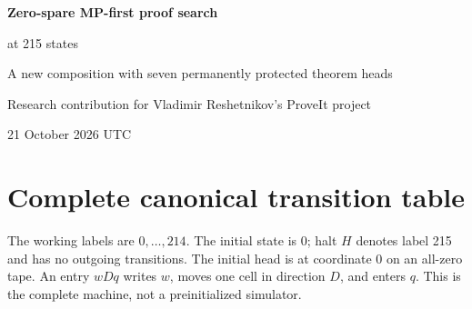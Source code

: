 \documentclass[11pt]{article}
\begin{document}
\begin{center}
{\LARGE\bfseries Zero-spare MP-first proof search\par at 215 states}\par\vspace{8pt}
{\large A new composition with seven permanently protected theorem heads}\par\vspace{5pt}
{Research contribution for Vladimir Reshetnikov's ProveIt project}\par
{21 October 2026 UTC}
\end{center}
\begin{abstract}
We construct a materially different 215-working-state, binary, single-tape machine started on an everywhere blank tape. Its command language is the newly published MP-first transfer language; its physical allocator uses zero-valued spare blocks instead of the parent's unit-valued blocks. Neither feature is claimed as newly invented in isolation. Their combination has a different transition graph and a different initialization proof. The exact 73,172-step blank prefix reaches a matched interior axiom-emission frame with an initially unsafe cache. Completion of that axiom leaves eight theorem heads above a suffix whose theoremhood is not assumed. A Cantor-diagonal credit theorem for the MP-first enumeration bounds all future conservative debt by one, permanently protecting the suffix below at least seven heads.

The machine is accompanied by its full transition table, source, construction recipe, exact native/dense startup replay, and arbitrary-natural primitive-runtime certificate. The numerical calculus and its ZFC calibration are inherited with explicit attribution. This is a new composition and ordinary mathematical proof, not a claim of 214 states, minimum size, unconditional nonhalting, or a newly compiled proof-assistant endpoint for these exact bytes.
\end{abstract}
\setcounter{tocdepth}{1}\tableofcontents




\clearpage\appendix
\section{Complete canonical transition table}
The working labels are $0,\ldots,214$. The initial state is 0; halt $H$ denotes label 215 and has no outgoing transitions. The initial head is at coordinate 0 on an all-zero tape. An entry $wDq$ writes $w$, moves one cell in direction $D$, and enters $q$. This is the complete machine, not a preinitialized simulator.

\end{document}
